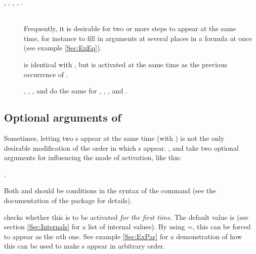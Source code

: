 \documentclass[12pt]{scrartcl}
\let\newslide=\relax
\begin{document}
\begin{description}
  \item[\small%
    ,
    ,
    ,
    ,
    .]\mbox{}\\
    Frequently, it is desirable for two or more steps to appear at the same
    time, for instance to fill in arguments at
    several places in a formula at once (see example \ref{Sec:ExEq}).

     is identical with , but is
    activated at the same time as the previous occurrence of .

    , , , and
     do the same for , , , and
    .
  \end{description}

  \newslide

  \subsection{Optional arguments of }%
  Sometimes, letting two s appear at the same time (with ) is not the only desirable
  modification of the order in which s appear. ,  and
   take two optional arguments for influencing the mode of activation, like this:
  \begin{center}
    .
  \end{center}
  Both  and  should be conditions in the syntax of the 
  command (see the documentation of the
  \href{ftp://ftp.dante.de/tex-archive/help/Catalogue/entries/ifthen.html}{} package for details).

  \newslide

   checks whether this  is to be activated \emph{for the first time}. The
  default value is  (see section \ref{Sec:Internals}
  for a list of internal values). By using =, this  can be forced to
  appear as the $n$th one. See example \ref{Sec:ExPar} for a demonstration of how this can be used to make
  s appear in arbitrary order.
\end{document}
